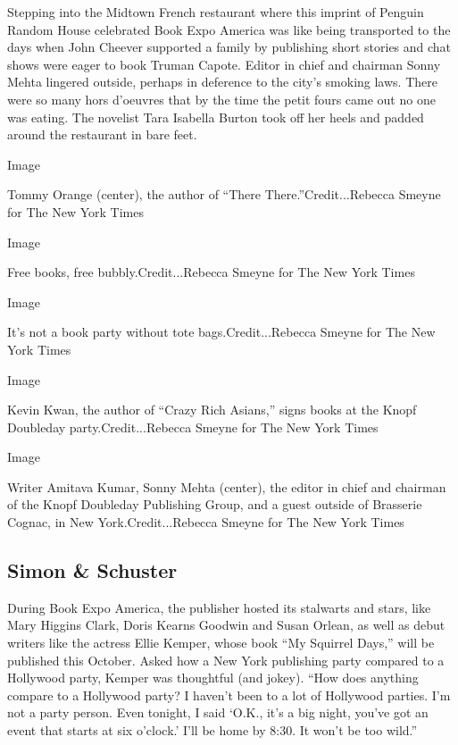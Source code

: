 Stepping into the Midtown French restaurant where this imprint of
Penguin Random House celebrated Book Expo America was like being
transported to the days when John Cheever supported a family by
publishing short stories and chat shows were eager to book Truman
Capote. Editor in chief and chairman Sonny Mehta lingered outside,
perhaps in deference to the city's smoking laws. There were so many hors
d'oeuvres that by the time the petit fours came out no one was eating.
The novelist Tara Isabella Burton took off her heels and padded around
the restaurant in bare feet.

Image

Tommy Orange (center), the author of ``There There.''Credit...Rebecca
Smeyne for The New York Times

Image

Free books, free bubbly.Credit...Rebecca Smeyne for The New York Times

Image

It's not a book party without tote bags.Credit...Rebecca Smeyne for The
New York Times

Image

Kevin Kwan, the author of ``Crazy Rich Asians,'' signs books at the
Knopf Doubleday party.Credit...Rebecca Smeyne for The New York Times

Image

Writer Amitava Kumar, Sonny Mehta (center), the editor in chief and
chairman of the Knopf Doubleday Publishing Group, and a guest outside of
Brasserie Cognac, in New York.Credit...Rebecca Smeyne for The New York
Times

\hypertarget{simon--schuster}{%
\subsection{Simon \& Schuster}\label{simon--schuster}}

During Book Expo America, the publisher hosted its stalwarts and stars,
like Mary Higgins Clark, Doris Kearns Goodwin and Susan Orlean, as well
as debut writers like the actress Ellie Kemper, whose book ``My Squirrel
Days,'' will be published this October. Asked how a New York publishing
party compared to a Hollywood party, Kemper was thoughtful (and jokey).
``How does anything compare to a Hollywood party? I haven't been to a
lot of Hollywood parties. I'm not a party person. Even tonight, I said
`O.K., it's a big night, you've got an event that starts at six
o'clock.' I'll be home by 8:30. It won't be too wild.''


